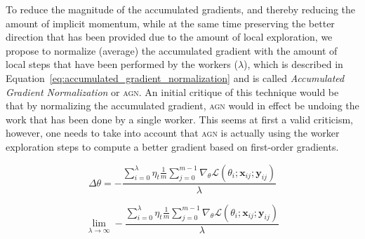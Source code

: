 To reduce the magnitude of the accumulated gradients, and thereby reducing the amount of implicit momentum, while at the same time preserving the better direction that has been provided due to the amount of local exploration, we propose to normalize (average) the accumulated gradient with the amount of local steps that have been performed by the workers ($\lambda$), which is described in Equation~\ref{eq:accumulated_gradient_normalization} and is called \emph{Accumulated Gradient Normalization} or \textsc{agn}. An initial critique of this technique would be that by normalizing the accumulated gradient, \textsc{agn} would in effect be undoing the work that has been done by a single worker. This seems at first a valid criticism, however, one needs to take into account that \textsc{agn} is actually using the worker exploration steps to compute a better gradient based on first-order gradients.

\begin{equation}
  \label{eq:accumulated_gradient_normalization}
  \Delta\theta = -\frac{\sum_{i = 0}^\lambda \eta_t \frac{1}{m}\sum_{j = 0}^{m - 1} \nabla_\theta \mathcal{L}(\theta_i;\textbf{x}_{ij};\textbf{y}_{ij})}{\lambda}
\end{equation}

\begin{equation}
  \lim_{\lambda \to \infty} -\frac{\sum_{i = 0}^\lambda \eta_t \frac{1}{m}\sum_{j = 0}^{m - 1} \nabla_\theta \mathcal{L}(\theta_i;\textbf{x}_{ij};\textbf{y}_{ij})}{\lambda}
\end{equation}
